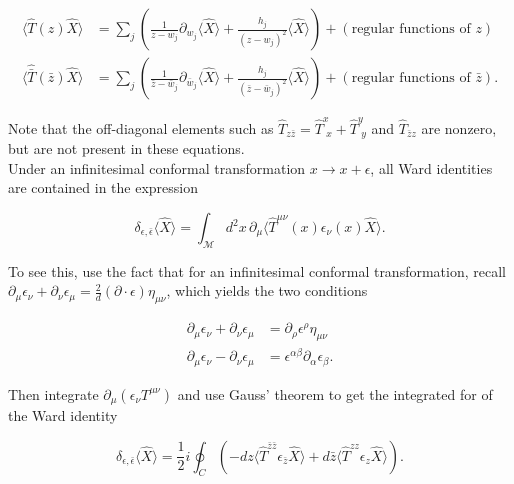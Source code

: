 \begin{align}
\langle \hat{T} (z) \hat{X} \rangle &= \sum_j \left( \frac{1}{z-w_j} \partial_{w_j} \langle \hat{X} \rangle + \frac{h_j}{(z-w_j)^2} \langle \hat{X} \rangle \right) + \left( \text{regular functions of } z \right) \\
\langle \hat{\bar{T}} (\bar{z}) \hat{X} \rangle &= \sum_j \left( \frac{1}{\bar{z}-\bar{w}_j} \partial_{\bar{w}_j} \langle \hat{X} \rangle + \frac{h_j}{(\bar{z}-\bar{w}_j)^2} \langle \hat{X} \rangle \right) + \left( \text{regular functions of } \bar{z} \right).
\end{align}

\noindent Note that the off-diagonal elements such as $\hat{T}_{z\bar{z}} = \hat{T}^x_{\,\,x} + \hat{T}^y_{\,\,y}$ and $\hat{T}_{\bar{z}z}$ are nonzero, but are not present in these equations. \\

\noindent Under an infinitesimal conformal transformation $x \rightarrow x+\epsilon$, all Ward identities are contained in the expression

\begin{equation}
\delta_{\epsilon, \bar{\epsilon}} \langle \hat{X} \rangle = \int_\mathcal{M} d^2 x \, \partial_\mu \langle \hat{T}^{\mu\nu} (x) \epsilon_\nu (x) \hat{X} \rangle.
\end{equation}

\noindent To see this, use the fact that for an infinitesimal conformal transformation, recall $\partial_\mu \epsilon_\nu + \partial_\nu \epsilon_\mu = \frac{2}{d} (\partial\cdot \epsilon) \eta_{\mu\nu}$, which yields the two conditions

\begin{align}
\partial_\mu \epsilon_\nu + \partial_\nu \epsilon_\mu &= \partial_\rho \epsilon^\rho \eta_{\mu\nu} \\
\partial_\mu \epsilon_\nu - \partial_\nu \epsilon_\mu &= \epsilon^{\alpha \beta} \partial_\alpha \epsilon_\beta.
\end{align}

\noindent Then integrate $\partial_\mu (\epsilon_\nu T^{\mu\nu})$ and use Gauss' theorem to get the integrated for of the Ward identity

\begin{equation}
\delta_{\epsilon, \bar{\epsilon}} \langle \hat{X} \rangle = \frac{1}{2} i \oint_C \left( -dz \langle \hat{T}^{\bar{z} \bar{z}} \epsilon_{\bar{z}} \hat{X} \rangle + d\bar{z} \langle \hat{T}^{zz} \epsilon_z \hat{X} \rangle \right).
\end{equation}

